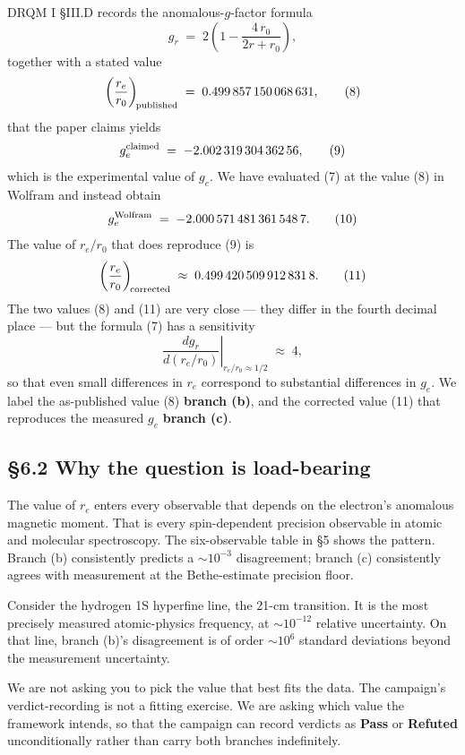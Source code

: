 \documentclass[
  11pt,
]{article}
\begin{document}
DRQM I §III.D records the anomalous-\(g\)-factor formula \[
g_{r} \;=\; 2\!\left(1 - \frac{4\,r_{0}}{2r + r_{0}}\right),
\tag{7}
\] together with a stated value \[
\left(\frac{r_{e}}{r_{0}}\right)_{\!\rm published} \;=\; 0.499\,857\,150\,068\,631,
\tag{8}
\] that the paper claims yields \[
g_{e}^{\rm claimed} \;=\; -2.002\,319\,304\,362\,56,
\tag{9}
\] which is the experimental value of \(g_{e}\). We have evaluated (7)
at the value (8) in Wolfram and instead obtain \[
g_{e}^{\rm Wolfram} \;=\; -2.000\,571\,481\,361\,548\,7.
\tag{10}
\] The value of \(r_{e}/r_{0}\) that does reproduce (9) is \[
\left(\frac{r_{e}}{r_{0}}\right)_{\!\rm corrected} \;\approx\; 0.499\,420\,509\,912\,831\,8.
\tag{11}
\] The two values (8) and (11) are very close --- they differ in the
fourth decimal place --- but the formula (7) has a sensitivity \[
\left.\frac{d g_{r}}{d(r_{e}/r_{0})}\right|_{r_{e}/r_{0}\approx 1/2} \;\approx\; 4,
\tag{12}
\] so that even small differences in \(r_{e}\) correspond to substantial
differences in \(g_{e}\). We label the as-published value (8)
\textbf{branch (b)}, and the corrected value (11) that reproduces the
measured \(g_{e}\) \textbf{branch (c)}.

\hypertarget{why-the-question-is-load-bearing}{%
\subsection{§6.2 Why the question is
load-bearing}\label{why-the-question-is-load-bearing}}

The value of \(r_{e}\) enters every observable that depends on the
electron's anomalous magnetic moment. That is every spin-dependent
precision observable in atomic and molecular spectroscopy. The
six-observable table in §5 shows the pattern. Branch (b) consistently
predicts a \(\sim 10^{-3}\) disagreement; branch (c) consistently agrees
with measurement at the Bethe-estimate precision floor.

Consider the hydrogen 1S hyperfine line, the 21-cm transition. It is the
most precisely measured atomic-physics frequency, at \(\sim 10^{-12}\)
relative uncertainty. On that line, branch (b)'s disagreement is of
order \(\sim 10^{6}\) standard deviations beyond the measurement
uncertainty.

We are not asking you to pick the value that best fits the data. The
campaign's verdict-recording is not a fitting exercise. We are asking
which value the framework intends, so that the campaign can record
verdicts as \textbf{Pass} or \textbf{Refuted} unconditionally rather
than carry both branches indefinitely.
\end{document}
